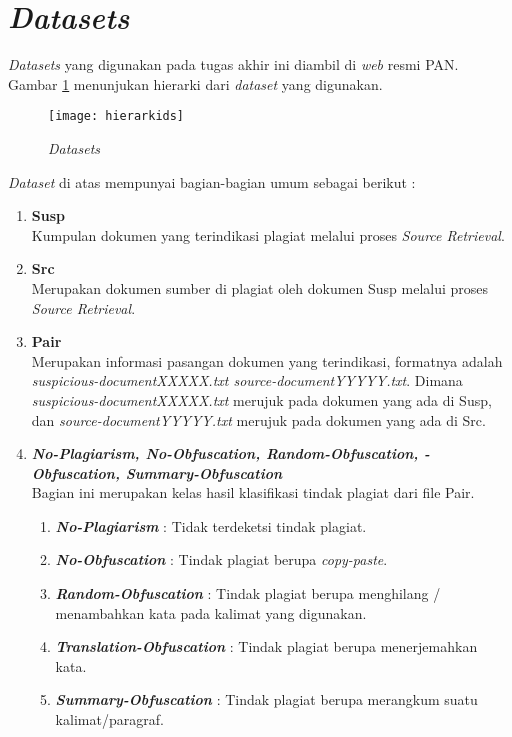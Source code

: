 \documentclass[../Book.tex]{subfiles}
\begin{document}
	\section{\textit{Datasets}}
	\textit{Datasets} yang digunakan pada tugas akhir ini diambil di \textit{web} resmi PAN\cite{pan-task-2014, dataset}. Gambar \ref{fig:Dataset} menunjukan hierarki dari \textit{dataset} yang digunakan.
	
	\begin{figure}[H]
		
		\texttt{[image: hierarkids]}
		\caption[Dataset]{\textit{Datasets}}
		\label{fig:Dataset}
	\end{figure}
	
	\textit{Dataset} di atas mempunyai bagian-bagian umum sebagai berikut : 
	\begin{enumerate}
		\item \textbf{Susp}\\
		Kumpulan dokumen yang terindikasi plagiat melalui proses \textit{Source Retrieval}.
		\item \textbf{Src}\\
		Merupakan dokumen sumber di plagiat oleh dokumen Susp melalui proses \textit{Source Retrieval}.
		\item \textbf{Pair}\\
		Merupakan informasi pasangan dokumen yang terindikasi, formatnya adalah \textit{suspicious-documentXXXXX.txt source-documentYYYYY.txt}. Dimana \textit{suspicious-documentXXXXX.txt} merujuk pada dokumen yang ada di Susp, dan \textit{source-documentYYYYY.txt} merujuk pada dokumen yang ada di Src.
		\item \textbf{\textit{No-Plagiarism, No-Obfuscation, Random-Obfuscation, -Obfuscation, Summary-Obfuscation}}\\
		Bagian ini merupakan kelas hasil klasifikasi tindak plagiat dari file Pair.
		\begin{enumerate}
			\item \textit{\textbf{No-Plagiarism}} : Tidak terdeketsi tindak plagiat.
			\item \textit{\textbf{No-Obfuscation}} : Tindak plagiat berupa \textit{copy-paste}.
			\item \textit{\textbf{Random-Obfuscation}} : Tindak plagiat berupa menghilang / menambahkan kata pada kalimat yang digunakan.
			\item \textit{\textbf{Translation-Obfuscation}} : Tindak plagiat berupa menerjemahkan kata.
			\item \textit{\textbf{Summary-Obfuscation}} : Tindak plagiat berupa merangkum suatu kalimat/paragraf.
		\end{enumerate}
	\end{enumerate}
	
\end{document}
